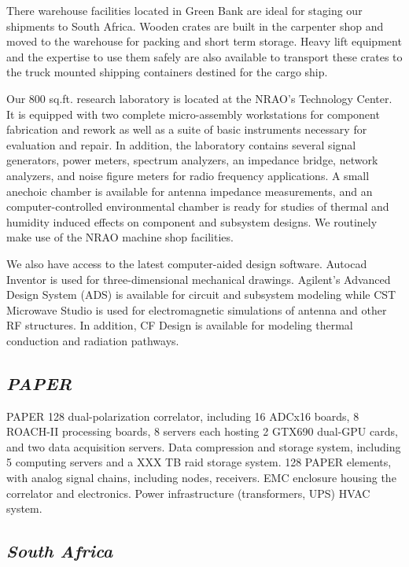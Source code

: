 \documentclass[11pt]{article}
\begin{document}
There warehouse facilities located in Green Bank are ideal for staging our
shipments to South Africa. Wooden crates are built in the carpenter shop and
moved to the warehouse for packing and short term storage. Heavy lift
equipment and the expertise to use them safely are also available to transport
these crates to the truck mounted shipping containers destined for the cargo
ship.

Our 800 sq.ft. research laboratory is located at the NRAO’s Technology Center.
It is equipped with two complete micro-assembly workstations for component
fabrication and rework as well as a suite of basic instruments necessary for
evaluation and repair. In addition, the laboratory contains several signal
generators, power meters, spectrum analyzers, an impedance bridge, network
analyzers, and noise figure meters for radio frequency applications. A small
anechoic chamber is available for antenna impedance measurements, and an
computer-controlled environmental chamber is ready for studies of thermal and
humidity induced effects on component and subsystem designs. We routinely make
use of the NRAO machine shop facilities.

We also have access to the latest computer-aided design software. Autocad
Inventor is used for three-dimensional mechanical drawings. Agilent’s Advanced
Design System (ADS) is available for circuit and subsystem modeling while CST
Microwave Studio is used for electromagnetic simulations of antenna and other
RF structures. In addition, CF Design is available for modeling thermal
conduction and radiation pathways.

\subsection*{\it PAPER}

PAPER 128 dual-polarization correlator, including 16 ADCx16 boards, 
8 ROACH-II processing boards, 8 servers each hosting 2 GTX690 dual-GPU cards,
and two data acquisition servers.
Data compression and storage system, including 5 computing servers and 
a XXX TB raid storage system.
128 PAPER elements, with analog signal chains, including nodes, receivers.
EMC enclosure housing the correlator and electronics.
Power infrastructure (transformers, UPS)
HVAC system.

\subsection*{\it South Africa}
\end{document}
